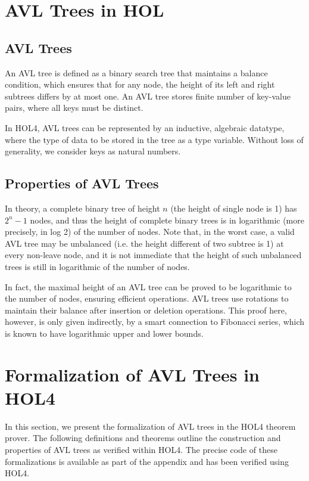 \documentclass[12pt]{article}
\begin{document}
\section{AVL Trees in HOL}

\subsection{AVL Trees}

An AVL tree is defined as a binary search tree that maintains a balance condition, which ensures that for any node, the height of its left and right subtrees differs by at most one. An AVL tree stores finite number of key-value pairs, where all keys must be distinct.

In HOL4, AVL trees can be represented by an inductive, algebraic datatype, where the type of data to be stored in the tree as a type variable. Without loss of generality, we consider keys as natural numbers.

\subsection{Properties of AVL Trees}

In theory, a complete binary tree of height $n$ (the height of single node is 1) has $2^n-1$ nodes, and thus
the height of complete binary trees is in logarithmic (more precisely, in log 2) of the number of nodes.
Note that, in the worst case, a valid AVL tree may be unbalanced (i.e. the height different of two subtree is 1) at
every non-leave node, and it is not immediate that the height of such unbalanced trees is still in logarithmic
of the number of nodes.

In fact, the maximal height of an AVL tree can be proved to be logarithmic to the number of nodes, ensuring efficient operations. AVL trees use rotations to maintain their balance after insertion or deletion operations. This proof here, however, is only given indirectly, by a smart connection to Fibonacci series, which is known to have logarithmic upper and lower bounds.

\section{Formalization of AVL Trees in HOL4}

In this section, we present the formalization of AVL trees in the HOL4 theorem prover. The following definitions and theorems outline the construction and properties of AVL trees as verified within HOL4. The precise code of these formalizations is available as part of the appendix and has been verified using HOL4.
\end{document}
